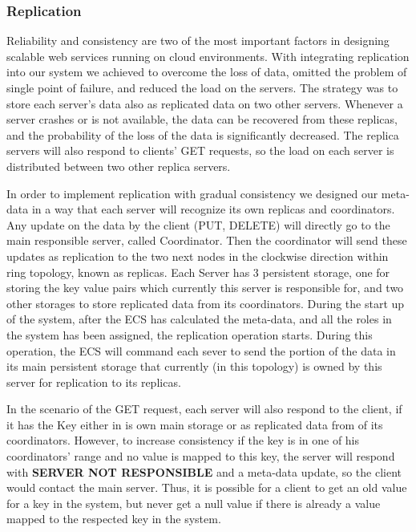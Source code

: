 \documentclass{sig-alternate}
\begin{document}
\subsubsection{Replication}
Reliability and consistency are two of the most important factors in designing scalable web services running on cloud environments. With integrating replication into our system we achieved to overcome the loss of data, omitted the problem of single point of failure, and reduced the load on the servers. The strategy was to store each server's data also as replicated data on two other servers. Whenever a server crashes or is not available, the data can be recovered from these replicas, and the probability of the loss of the data is  significantly decreased. The replica servers will also respond to clients' GET requests, so the load on each server is distributed between two other replica servers. 

In order to implement replication with gradual consistency we designed our meta-data in a way that each server will recognize its own replicas and coordinators. Any update on the data by the client (PUT, DELETE) will directly go to the main responsible server, called Coordinator. Then the coordinator will send these updates as replication to the two next nodes in the clockwise direction within ring topology, known as replicas. Each Server has 3 persistent storage, one for storing the key value pairs which currently this server is responsible for, and two other storages to store replicated data from its coordinators. During the start up of the system, after the ECS has calculated the meta-data, and all the roles in the system has been assigned, the replication operation starts. During this operation, the ECS will command each sever to send the portion of the data in its main persistent storage that currently (in this topology) is owned by this server for replication to its replicas.  

In the scenario of the GET request, each server will also respond to the client, if it has the Key either in is own main storage or as replicated data from of its coordinators. However, to increase consistency if the key is in one of his coordinators' range and no value is mapped to this key, the server will respond with \textbf{SERVER NOT RESPONSIBLE} and a meta-data update, so the client would contact the main server. Thus, it is possible for a client to get an old value for a key in the system, but never get a null value if there is already a value mapped to the respected key in the system.
\end{document}
